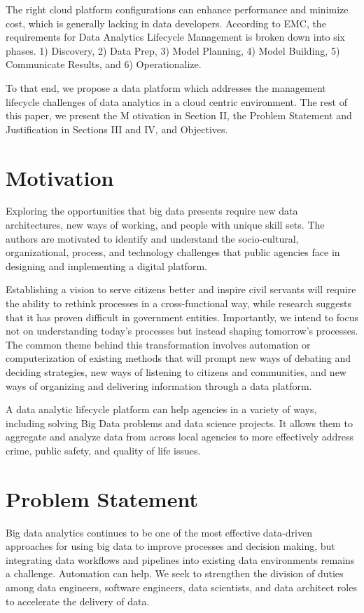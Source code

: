 \documentclass[conference]{IEEEtran}
\begin{document}
The right cloud platform configurations can enhance performance and minimize cost, which is generally lacking in data developers. According to EMC\cite{EMC}, the requirements for Data Analytics Lifecycle Management is broken down into six phases. 1) Discovery, 2) Data Prep, 3) Model Planning, 4) Model Building, 5) Communicate Results, and 6) Operationalize.

To that end, we propose a data platform which addresses the management lifecycle challenges of data analytics in a cloud centric environment.  The rest of this paper, we present the M otivation in Section II, the Problem Statement and Justification in Sections III and IV, and Objectives.
%
%
%
\section{Motivation}
Exploring the opportunities that big data presents require new data architectures,  new ways of working, and people with unique skill sets. The authors are motivated to identify and understand the socio-cultural, organizational, process, and technology challenges that public agencies face in designing and implementing a digital platform.  

Establishing a vision to serve citizens better and inspire civil servants will require the ability to rethink processes in a cross-functional way, while research suggests that it has proven difficult in government entities\cite{Weerakkody}.  Importantly, we intend to focus not on understanding today's processes but instead shaping tomorrow's processes. The common theme behind this transformation involves automation or computerization of existing methods that will prompt new ways of debating and deciding strategies, new ways of listening to citizens and communities, and new ways of organizing and delivering information\cite{eGov} through a data platform.  

A data analytic lifecycle platform can help agencies in a variety of ways, including solving Big Data problems and data science projects. It allows them to aggregate and analyze data from across local agencies to more effectively address crime, public safety, and quality of life issues. 
%
%
\section{Problem Statement}
Big data analytics continues to be one of the most effective data-driven approaches for using big data to improve processes and decision making, but integrating data workflows and pipelines into existing data environments remains a challenge. Automation can help.  We seek to strengthen the division of duties among data engineers, software engineers, data scientists, and data architect roles to accelerate the delivery of data.
\end{document}
